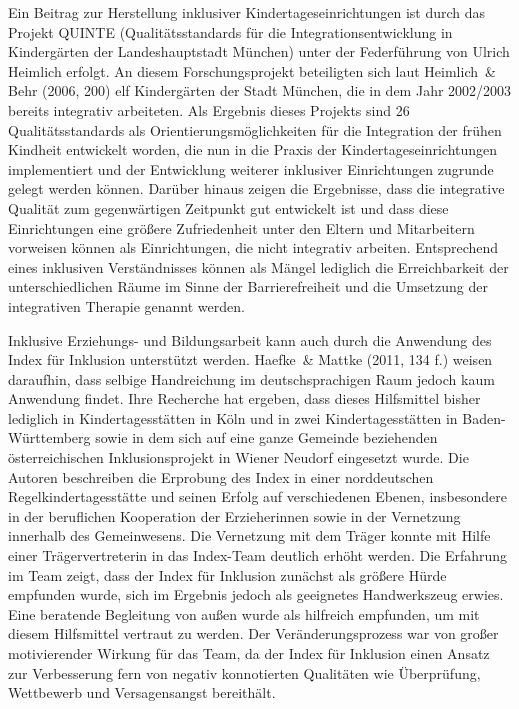 Ein Beitrag zur Herstellung inklusiver Kindertageseinrichtungen ist durch das Projekt QUINTE (Qualitätsstandards für die Integrationsentwicklung in Kindergärten der Landeshauptstadt München) unter der Federführung von Ulrich Heimlich erfolgt. An diesem Forschungsprojekt beteiligten sich laut Heimlich~\& Behr (2006, 200) elf Kindergärten der Stadt München, die in dem Jahr 2002/2003 bereits integrativ arbeiteten. Als Ergebnis dieses Projekts sind 26 Qualitätsstandards als Orientierungsmöglichkeiten für die Integration der frühen Kindheit entwickelt worden, die nun in die Praxis der Kindertageseinrichtungen implementiert und der Entwicklung weiterer inklusiver Einrichtungen zugrunde gelegt werden können. 
Darüber hinaus zeigen die Ergebnisse, dass die integrative Qualität zum gegenwärtigen Zeitpunkt gut entwickelt ist und dass diese Einrichtungen eine größere Zufriedenheit unter den Eltern und Mitarbeitern vorweisen können als Einrichtungen, die nicht integrativ arbeiten. Entsprechend eines inklusiven Verständnisses können als Mängel lediglich die Erreichbarkeit der unterschiedlichen Räume im Sinne der Barrierefreiheit und die Umsetzung der integrativen Therapie genannt werden.  

Inklusive Erziehungs- und Bildungsarbeit kann auch durch die Anwendung des Index für Inklusion unterstützt werden. Haefke~\& Mattke (2011, 134 f.) weisen daraufhin, dass selbige Handreichung im deutschsprachigen Raum jedoch kaum Anwendung findet. Ihre Recherche hat ergeben, dass dieses Hilfsmittel bisher lediglich in Kindertagesstätten in Köln und in zwei Kindertagesstätten in Baden-Württemberg sowie in dem sich auf eine ganze Gemeinde beziehenden österreichischen Inklusionsprojekt in Wiener Neudorf eingesetzt wurde. Die Autoren beschreiben die Erprobung des Index in einer norddeutschen Regelkindertagesstätte und seinen Erfolg auf verschiedenen Ebenen, insbesondere in der beruflichen Kooperation der Erzieherinnen sowie in der Vernetzung innerhalb des Gemeinwesens. Die Vernetzung mit dem Träger konnte mit Hilfe einer Trägervertreterin in das Index-Team deutlich erhöht werden. Die Erfahrung im Team zeigt, dass der Index für Inklusion zunächst als größere Hürde empfunden wurde, sich im Ergebnis jedoch als geeignetes Handwerkszeug erwies. Eine beratende Begleitung von außen wurde als hilfreich empfunden, um mit diesem Hilfsmittel vertraut zu werden. Der Veränderungsprozess war von großer motivierender Wirkung für das Team, da der Index für Inklusion einen Ansatz zur Verbesserung fern von negativ konnotierten Qualitäten wie Überprüfung, Wettbewerb und Versagensangst bereithält.

